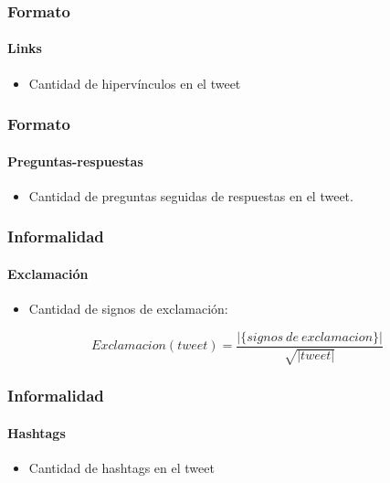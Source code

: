 \begin{frame}
    \frametitle{Formato}
    \framesubtitle{Links}

    \begin{itemize}
        \item Cantidad de hipervínculos en el tweet
    \end{itemize}
\end{frame}

\begin{frame}
    \frametitle{Formato}
    \framesubtitle{Preguntas-respuestas}

    \begin{itemize}
        \item Cantidad de preguntas seguidas de respuestas en el tweet.
    \end{itemize}
\end{frame}

\begin{frame}
    \frametitle{Informalidad}
    \framesubtitle{Exclamación}

    \begin{itemize}
        \item Cantidad de signos de exclamación:
    \end{itemize}

    \begin{center}
        \[
            Exclamacion(tweet) = \frac{|\{signos\ de\ exclamacion\}|}{\sqrt{|tweet|}}
        \]
    \end{center}
\end{frame}

\begin{frame}
    \frametitle{Informalidad}
    \framesubtitle{Hashtags}

    \begin{itemize}
        \item Cantidad de hashtags en el tweet
    \end{itemize}
\end{frame}

